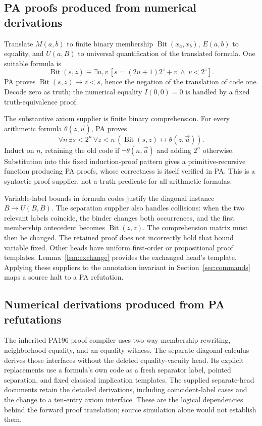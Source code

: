 \documentclass[10pt,letterpaper]{article}
\begin{document}
\subsection{PA proofs produced from numerical derivations}

Translate \(M(a,b)\) to finite binary membership
\(\operatorname{Bit}(x_a,x_b)\), \(E(a,b)\) to equality, and \(U(a,B)\)
to universal quantification of the translated formula. One suitable formula
is
\[
 \operatorname{Bit}(s,z)\equiv
 \exists u,v\,[s=(2u+1)2^z+v\ \wedge\ v<2^z].
\]
PA proves \(\operatorname{Bit}(s,z)\to z<s\), hence the negation of the
translation of code one. Decode zero as truth; the numerical equality
\(I(0,0)=0\) is handled by a fixed truth-equivalence proof.

The substantive axiom supplier is finite binary comprehension. For every
arithmetic formula \(\theta(z,\vec u)\), PA proves
\[
 \forall n\,\exists s<2^n\,\forall z<n\,
          (\operatorname{Bit}(s,z)\leftrightarrow\theta(z,\vec u)).
\]
Induct on \(n\), retaining the old code if \(\neg\theta(n,\vec u)\) and
adding \(2^n\) otherwise. Substitution into this fixed induction-proof
pattern gives a primitive-recursive function producing PA proofs, whose
correctness is itself verified in PA. This is a syntactic proof supplier,
not a truth predicate for all arithmetic formulas.

Variable-label bounds in formula codes justify the diagonal instance
\(B\to U(B,B)\). The separation supplier also handles collisions: when
the two relevant labels coincide, the binder changes both occurrences,
and the first membership antecedent becomes \(\operatorname{Bit}(z,z)\).
The comprehension matrix must then be changed. The retained proof does
not incorrectly hold that bound variable fixed. Other heads have uniform
first-order or propositional proof templates. Lemma~\ref{lem:exchange}
provides the exchanged head's template. Applying these suppliers to the
annotation invariant in Section~\ref{sec:commands} maps a source halt to
a PA refutation.

\subsection{Numerical derivations produced from PA refutations}

The inherited PA196 proof compiler uses two-way membership rewriting,
neighborhood equality, and an equality witness. The separate diagonal
calculus derives those interfaces without the deleted equality-vacuity
head. Its explicit replacements use a formula's own code as a fresh
separator label, pointed separation, and fixed classical implication
templates. The supplied separate-head documents retain the detailed
derivations, including coincident-label cases and the change to a ten-entry
axiom interface. These are the logical dependencies behind the forward
proof translation; source simulation alone would not establish them.
\end{document}
